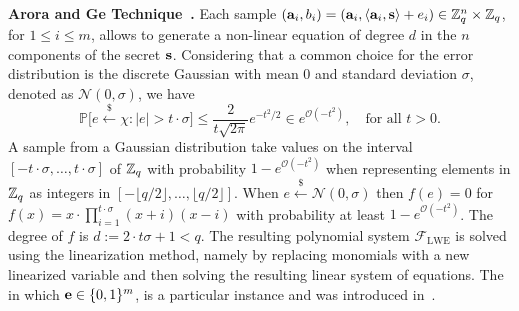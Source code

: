 \noindent
\textbf{Arora and Ge Technique~\cite{ICALP:AroGe11}.} 
Each sample $(\mathbf{a}_i, b_i) = (\mathbf{a}_i, \langle\mathbf{a}_i, \mathbf{s}\rangle + e_i) \in \mathbb{Z}_q^n \times \mathbb{Z}_q$, for $1 \leq i \leq m$, allows to generate a non-linear equation of degree $d$ in the $n$ components of the secret $\mathbf{s}$. %
Considering that a common choice for the error distribution is the discrete Gaussian with mean $0$ and standard deviation $\sigma$, denoted as $\mathcal{N}(0,\sigma)$,
we have
\[
\mathbb{P}\big[ e \overset{\scriptscriptstyle\$}{\gets} \chi : |e| > t \cdot \sigma \big] \leq \frac{2}{t\sqrt{2\pi}} e^{-t^2/2}\in e^{\mathcal{O}({-t^2})}, \quad \textrm{for all } t>0.
\]
A sample from a Gaussian distribution take values on the interval $[-t\cdot\sigma,\dots,t\cdot\sigma]$ of $\mathbb{Z}_q$ with probability $1 - e^{\mathcal{O}({-t^2})}$ when representing elements in $\mathbb{Z}_q$ as integers in $[-\lfloor q/2 \rfloor, \dots, \lfloor q/2 \rfloor]$.
When $e \overset{\scriptscriptstyle \$}{\gets} \mathcal{N}(0,\sigma)$ then $f(e)=0$ for $f(x) = x \cdot \prod_{i=1}^{t\cdot\sigma} (x+i)(x-i)$ with probability at least $1 - e^{\mathcal{O}({-t^2})}$.
The degree of $f$ is $d := 2 \cdot t \sigma + 1 < q$. %
The resulting polynomial system $\mathcal{F}_{\mathrm{LWE}}$ is solved using the linearization method, namely by replacing monomials with a new linearized variable and then solving the resulting linear system of equations. %
The \belwe\, in which $\mathbf{e} \in \{0,1\}^m$, is a particular instance and was introduced in~\cite{MicPei13}.


